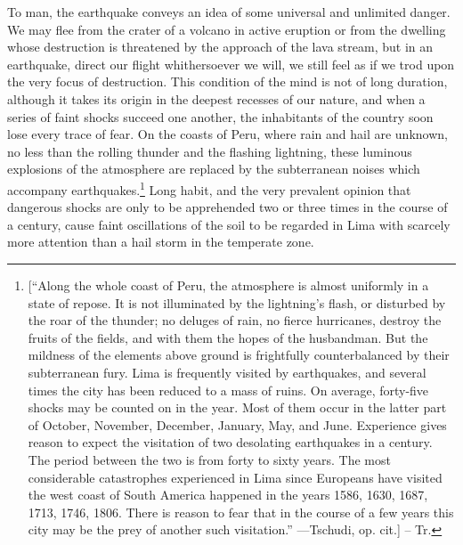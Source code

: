 To man, the earthquake conveys an idea of some universal and unlimited danger. We may flee from the crater of a volcano in active eruption or from the dwelling whose destruction is threatened by the approach of the lava stream, but in an earthquake, direct our flight whithersoever we will, we still feel as if we trod upon the very focus of destruction. This condition of the mind is not of long duration, although it takes its origin in the deepest recesses of our nature, and when a series of faint shocks succeed one another, the inhabitants of the country soon lose every trace of fear. On the coasts of Peru, where rain and hail are unknown, no less than the rolling thunder and the flashing lightning, these luminous explosions of the atmosphere are replaced by the subterranean noises which accompany earthquakes.\footnote{[``Along the whole coast of Peru, the atmosphere is almost uniformly in a state of repose. It is not illuminated by the lightning's flash, or disturbed by the roar of the thunder; no deluges of rain, no fierce hurricanes, destroy the fruits of the fields, and with them the hopes of the husbandman. But the mildness of the elements above ground is frightfully counterbalanced by their subterranean fury. Lima is frequently visited by earthquakes, and several times the city has been reduced to a mass of ruins. On average, forty-five shocks may be counted on in the year. Most of them occur in the latter part of October, November, December, January, May, and June. Experience gives reason to expect the visitation of two desolating earthquakes in a century. The period between the two is from forty to sixty years. The most considerable catastrophes experienced in Lima since Europeans have visited the west coast of South America happened in the years 1586, 1630, 1687, 1713, 1746, 1806. There is reason to fear that in the course of a few years this city may be the prey of another such visitation.'' —Tschudi, op. cit.] -- Tr.} Long habit, and the very prevalent opinion that dangerous shocks are only to be apprehended two or three times in the course of a century, cause faint oscillations of the soil to be regarded in Lima with scarcely more attention than a hail storm in the temperate zone.